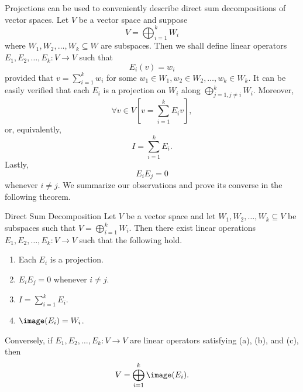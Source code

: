\documentclass[linearalgebra]{subfiles}
\begin{document}
    \begin{remark}
        Projections can be used to conveniently describe direct sum decompositions of vector spaces. Let $V$ be a vector space and suppose
        \begin{equation*}
            V = \bigoplus^{k}_{i=1} W_i
        \end{equation*}
        where $W_1, W_2, \ldots, W_k\subseteq W$ are subspaces. Then we shall define linear operators $E_1, E_2, \ldots, E_k:V\to V$ such that
        \begin{equation*}
            E_i(v) = w_i
        \end{equation*}
        provided that $v = \sum^{k}_{i=1} w_i$ for some $w_1\in W_1, w_2\in W_2, \ldots, w_k\in W_k$. It can be easily verified that each $E_i$ is a projection on $W_i$ along $\bigoplus^{k}_{j=1, j\neq i} W_i$. Moreover,
        \begin{equation*}
            \forall v\in V \left[ v = \sum^{k}_{i=1} E_iv \right],
        \end{equation*}
        or, equivalently,
        \begin{equation*}
            I = \sum^{k}_{i=1} E_i. 
        \end{equation*}
        Lastly,
        \begin{equation*}
            E_iE_j = 0
        \end{equation*}
        whenever $i\neq j$. We summarize our observations and prove its converse in the following theorem.
    \end{remark}

    \clearpage
    \begin{theorem}{Direct Sum Decomposition}
        Let $V$ be a vector space and let $W_1, W_2, \ldots, W_k\subseteq V$ be subspaces such that $V = \bigoplus^{k}_{i=1} W_i$. Then there exist linear operations $E_1, E_2, \ldots, E_k:V\to V$ such that the following hold.
        \begin{enumerate}
            \item Each $E_i$ is a projection.
            \item $E_iE_j = 0$ whenever $i\neq j$. 
            \item $I = \sum^{k}_{i=1} E_i$.
            \item $\image(E_i) = W_i$.
        \end{enumerate}
        Conversely, if $E_1, E_2, \ldots, E_k:V\to V$ are linear operators satisfying (a), (b), and (c), then
        \begin{equation*}
            V = \bigoplus^{k}_{i=1} \image(E_i).
        \end{equation*}
    \end{theorem}
\end{document}
